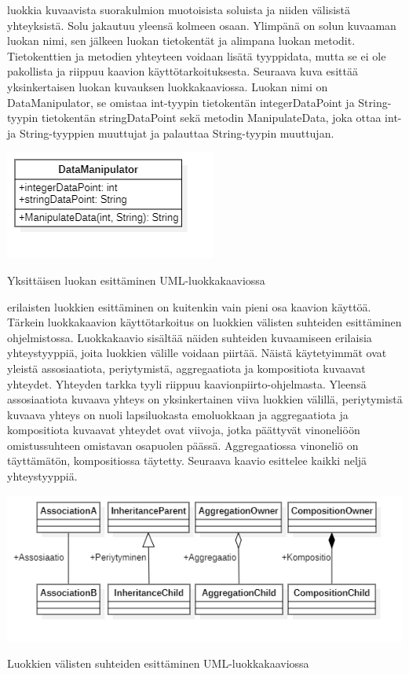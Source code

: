 \documentclass{tufte-book}
\begin{document}
 luokkia kuvaavista suorakulmion muotoisista soluista ja niiden
välisistä yhteyksistä. Solu jakautuu yleensä kolmeen osaan. Ylimpänä on solun kuvaaman luokan
nimi, sen jälkeen luokan tietokentät ja alimpana luokan metodit. Tietokenttien ja metodien
yhteyteen voidaan lisätä tyyppidata, mutta se ei ole pakollista ja riippuu kaavion
käyttötarkoituksesta. Seuraava kuva esittää yksinkertaisen luokan kuvauksen luokkakaaviossa.
Luokan nimi on DataManipulator, se omistaa int-tyypin tietokentän integerDataPoint ja
String-tyypin tietokentän stringDataPoint sekä metodin ManipulateData, joka ottaa int- ja
String-tyyppien muuttujat ja palauttaa String-tyypin muuttujan.

\begin{listing}
    \includegraphics{ClassDiagramExample1}
    \caption{Yksittäisen luokan esittäminen UML-luokkakaaviossa}
    \label{luokkakaavioluokka}
\end{listing}

 erilaisten luokkien esittäminen on kuitenkin vain pieni
osa kaavion käyttöä. Tärkein luokkakaavion käyttötarkoitus on luokkien välisten suhteiden
esittäminen ohjelmistossa. Luokkakaavio sisältää näiden suhteiden kuvaamiseen erilaisia
yhteystyyppiä, joita luokkien välille voidaan piirtää. Näistä käytetyimmät ovat yleistä
assosiaatiota, periytymistä, aggregaatiota ja kompositiota kuvaavat yhteydet. Yhteyden tarkka
tyyli riippuu kaavionpiirto-ohjelmasta. Yleensä assosiaatiota kuvaava yhteys on yksinkertainen
viiva luokkien välillä, periytymistä kuvaava yhteys on nuoli lapsiluokasta emoluokkaan ja
aggregaatiota ja kompositiota kuvaavat yhteydet ovat viivoja, jotka päättyvät vinoneliöön
omistussuhteen omistavan osapuolen päässä. Aggregaatiossa vinoneliö on täyttämätön,
kompositiossa täytetty. Seuraava kaavio esittelee kaikki neljä yhteystyyppiä.

\begin{listing}
    \includegraphics{ClassDiagramExample2}
    \caption{Luokkien välisten suhteiden esittäminen UML-luokkakaaviossa}
    \label{luokkakaavioluokka}
\end{listing}
\end{document}
